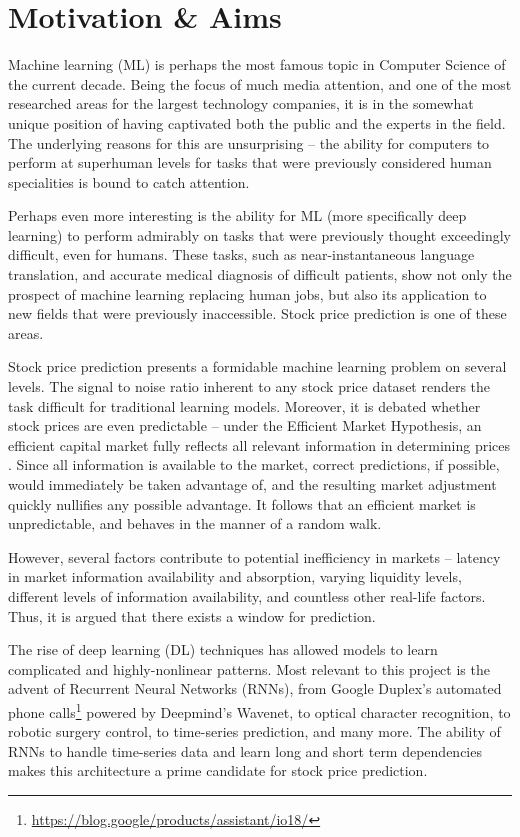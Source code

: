 \documentclass[12pt,a4paper,twoside,openright]{report}
\begin{document}
\section{Motivation \& Aims}
\label{sec:introMotiv}

Machine learning (ML) is perhaps the most famous topic in Computer Science of the current decade.
Being the focus of much media attention, and one of the most researched areas for the largest
technology companies, it is in the somewhat unique position of having captivated both the
public and the experts in the field. The underlying reasons for this are unsurprising --
the ability for computers to perform at superhuman levels for tasks that were previously
considered human specialities is bound to catch attention.

Perhaps even more interesting is the ability for ML (more specifically
deep learning) to perform
admirably on tasks that were previously thought exceedingly difficult,
even for humans. These tasks, such as near-instantaneous language translation\cite{Sutskever14}, and
accurate medical diagnosis of difficult patients\cite{Litjens17, Lee17}, show not only the prospect of machine learning
replacing human jobs, but also its application to new fields that were previously
inaccessible. Stock price prediction is one of these areas.

Stock price prediction presents a formidable machine learning problem on several levels.
The signal to noise ratio inherent to any stock price dataset renders the task difficult
for traditional learning models. Moreover, it is debated whether stock prices are
even predictable -- under the Efficient Market Hypothesis, an efficient capital market fully reflects
all relevant information in determining prices \cite{Malkiel89}. Since all
information is available to the market, correct predictions, if possible, would immediately be
taken advantage of, and the resulting market adjustment quickly nullifies any possible advantage.
It follows that an efficient market is unpredictable, and behaves in the manner of a random walk.

However, several factors contribute to potential inefficiency in markets --
latency in market information availability and absorption, varying liquidity levels, 
different levels of information availability, and countless other
real-life factors. Thus, it is argued that there exists a window for prediction\cite{Buffett10, Chan03, Basu77}.

The rise of deep learning (DL) techniques has allowed models to learn complicated and highly-nonlinear 
patterns. Most relevant to this project is the advent of Recurrent Neural Networks (RNNs), from
Google Duplex's automated phone calls\footnote{\url{https://blog.google/products/assistant/io18/}}
powered by Deepmind's Wavenet\cite{Oord16}, to optical character recognition\cite{Breuel13}, to
robotic surgery control\cite{Mayer08}, to time-series prediction\cite{Malhotra15, Lipton15}, and many more.
The ability of RNNs to handle time-series data and learn long and short term dependencies makes
this architecture a prime candidate for stock price prediction.
\end{document}
